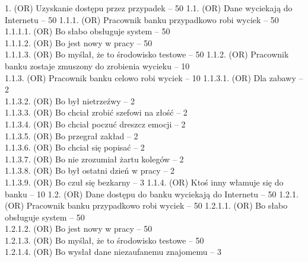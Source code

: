 \documentclass[10pt,a4paper,twoside]{article}
\newenvironment{subs}
{\adjustwidth{3em}{0pt}}
{\endadjustwidth}
\begin{document}
    1. (OR) Uzyskanie dostępu przez przypadek -- 50
    \begin{subs}
        1.1. (OR) Dane wyciekają do Internetu -- 50
        \begin{subs}
            1.1.1. (OR) Pracownik banku przypadkowo robi wyciek -- 50
            \begin{subs}
                1.1.1.1. (OR) Bo słabo obsługuje system -- 50 \\
                1.1.1.2. (OR) Bo jest nowy w pracy -- 50 \\
                1.1.1.3. (OR) Bo myślał, że to środowisko testowe -- 50
            \end{subs}
            1.1.2. (OR) Pracownik banku zostaje zmuszony do zrobienia wycieku -- 10 \\
            1.1.3. (OR) Pracownik banku celowo robi wyciek -- 10
            \begin{subs}
                1.1.3.1. (OR) Dla zabawy -- 2 \\
                1.1.3.2. (OR) Bo był nietrzeźwy -- 2 \\
                1.1.3.3. (OR) Bo chciał zrobić szefowi na złość -- 2 \\
                1.1.3.4. (OR) Bo chciał poczuć dreszcz emocji -- 2 \\
                1.1.3.5. (OR) Bo przegrał zakład -- 2 \\
                1.1.3.6. (OR) Bo chciał się popisać -- 2 \\
                1.1.3.7. (OR) Bo nie zrozumiał żartu kolegów -- 2 \\
                1.1.3.8. (OR) Bo był ostatni dzień w pracy  -- 2 \\
                1.1.3.9. (OR) Bo czuł się bezkarny -- 3
            \end{subs}
            1.1.4. (OR) Ktoś inny włamuje się do banku -- 10
        \end{subs}
        1.2. (OR) Dane dostępu do banku wyciekają do Internetu -- 50
        \begin{subs}
            1.2.1. (OR) Pracownik banku przypadkowo robi wyciek -- 50
            \begin{subs}
                1.2.1.1. (OR) Bo słabo obsługuje system -- 50 \\
                1.2.1.2. (OR) Bo jest nowy w pracy -- 50 \\
                1.2.1.3. (OR) Bo myślał, że to środowisko testowe -- 50 \\
                1.2.1.4. (OR) Bo wysłał dane niezaufanemu znajomemu -- 3

\end{subs}
\end{subs}
\end{subs}
\end{document}
